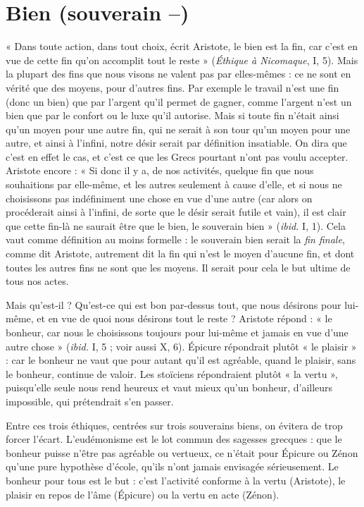 \section{Bien (souverain {\bf --})}
« Dans toute action, dans tout choix, écrit Aristote,
le bien est la fin, car c’est en vue de cette fin qu’on
accomplit tout le reste » ({\it Éthique à Nicomaque}, I, 5). Mais la plupart des fins
que nous visons ne valent pas par elles-mêmes : ce ne sont en vérité que des
moyens, pour d’autres fins. Par exemple le travail n’est une fin (donc un bien)
que par l’argent qu’il permet de gagner, comme l'argent n’est un bien que par
le confort ou le luxe qu’il autorise. Mais si toute fin n’était ainsi qu’un moyen
pour une autre fin, qui ne serait à son tour qu’un moyen pour une autre, et
ainsi à l'infini, notre désir serait par définition insatiable. On dira que c’est en
effet le cas, et c’est ce que les Grecs pourtant n’ont pas voulu accepter. Aristote
encore : « Si donc il y a, de nos activités, quelque fin que nous souhaitions par
elle-même, et les autres seulement à cause d’elle, et si nous ne choisissons pas
indéfiniment une chose en vue d’une autre (car alors on procéderait ainsi à
l'infini, de sorte que le désir serait futile et vain), il est clair que cette fin-là ne
saurait être que le bien, le souverain bien » ({\it ibid.} I, 1). Cela vaut comme définition
au moins formelle : le souverain bien serait la {\it fin finale}, comme dit Aristote,
autrement dit la fin qui n’est le moyen d’aucune fin, et dont toutes les
autres fins ne sont que les moyens. Il serait pour cela le but ultime de tous nos
actes.

Mais qu’est-il ? Qu'est-ce qui est bon par-dessus tout, que nous désirons
pour lui-même, et en vue de quoi nous désirons tout le reste ? Aristote répond :
« le bonheur, car nous le choisissons toujours pour lui-même et jamais en vue
d’une autre chose » ({\it ibid.} I, 5 ; voir aussi X, 6). Épicure répondrait plutôt « le
plaisir » : car le bonheur ne vaut que pour autant qu’il est agréable, quand le
plaisir, sans le bonheur, continue de valoir. Les stoïciens répondraient plutôt
« la vertu », puisqu’elle seule nous rend heureux et vaut mieux qu’un bonheur,
d’ailleurs impossible, qui prétendrait s’en passer.

Entre ces trois éthiques, centrées sur trois souverains biens, on évitera de
trop forcer l'écart. L’eudémonisme est le lot commun des sagesses grecques :
que le bonheur puisse n’être pas agréable ou vertueux, ce n’était pour Épicure
ou Zénon qu’une pure hypothèse d’école, qu’ils n’ont jamais envisagée sérieusement.
Le bonheur pour tous est le but : c’est l’activité conforme à la vertu
(Aristote), le plaisir en repos de l’âme (Épicure) ou la vertu en acte (Zénon).

